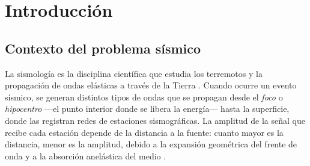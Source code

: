 \documentclass[12pt, a4paper]{article}
\begin{document}
\begin{abstract}
\noindent
Se aborda el problema de localización de una fuente sísmica formulado
como un problema inverso no lineal de cuatro parámetros
$\mathbf{m} = (x_0, y_0, z_0, A_0)$. A partir del modelo de atenuación
$A_0\,e^{-R}/R$ para ondas de cuerpo, se simularon datos en ocho
estaciones con ruido gaussiano heteroscedástico moderado
($\alpha = 0.05$). La estimación de los parámetros se abordó mediante
tres métodos complementarios: \emph{(i)} exploración exhaustiva por
grilla tridimensional de $100^3$ puntos con $A_0$ fijo, \emph{(ii)}
\emph{fuerza bruta perfilada}, que estima $\widehat{A}_0(x,y,z)$
analíticamente en cada celda mediante minimización parcial respecto
a $A_0$, y \emph{(iii)} el método iterativo de Levenberg--Marquardt
con backtracking. Los tres enfoques convergen a soluciones consistentes:
errores posicionales de $0.084$, $0.096$ y $0.075$~km, respectivamente.
El análisis espectral del jacobiano en la solución reveló un número
de condición $\kappa = 1.36\times 10^{5}$ y una incertidumbre formal
$\sigma_{z_0} = 0.60$~km, $17$ veces mayor que la incertidumbre
horizontal $\sigma_{x_0}\!\approx\!\sigma_{y_0}\!\approx\!0.035$~km.
La dirección peor resuelta del espacio de parámetros está dominada
en un $90\%$ por $z_0$ con acoplamiento opuesto a $A_0$, constituyendo
evidencia cuantitativa directa del \emph{trade-off} profundidad--amplitud
clásico de la sismología pasiva con redes superficiales.
\end{abstract}

\newpage
\tableofcontents
\listoffigures
\listoftables
\newpage

\section{Introducción}

\subsection{Contexto del problema sísmico}

La sismología es la disciplina científica que estudia los terremotos
y la propagación de ondas elásticas a través de la Tierra
\cite{shearer2019introduction, stein2003introduction}. Cuando ocurre
un evento sísmico, se generan distintos tipos de ondas que se propagan
desde el \textit{foco} o \textit{hipocentro} —el punto interior donde
se libera la energía— hasta la superficie, donde las registran redes
de estaciones sismográficas. La amplitud de la señal que recibe cada
estación depende de la distancia a la fuente: cuanto mayor es la
distancia, menor es la amplitud, debido a la expansión geométrica
del frente de onda y a la absorción anelástica del medio
\cite{aki1980attenuation, boore2003prediction}.
\end{document}
